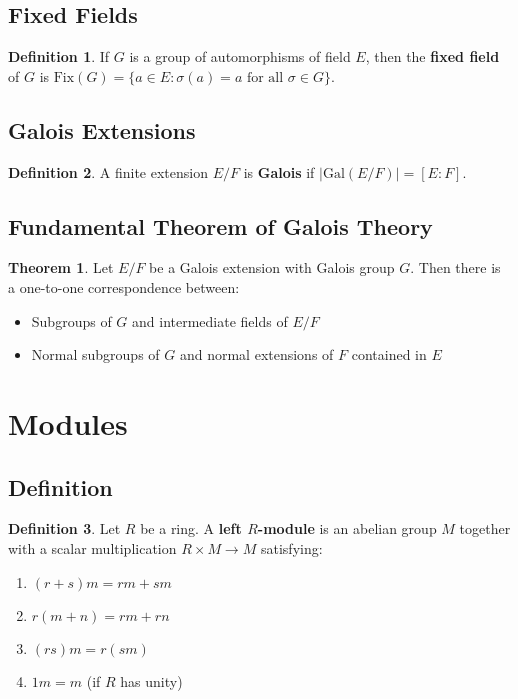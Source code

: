 \documentclass[11pt]{article}
\theoremstyle{definition}
\newtheorem{definition}{Definition}[section]
\newtheorem{theorem}{Theorem}[section]
\begin{document}
\subsection{Fixed Fields}
\begin{definition}
If $G$ is a group of automorphisms of field $E$, then the \textbf{fixed field} of $G$ is $\text{Fix}(G) = \{a \in E : \sigma(a) = a \text{ for all } \sigma \in G\}$.
\end{definition}

\subsection{Galois Extensions}
\begin{definition}
A finite extension $E/F$ is \textbf{Galois} if $|\text{Gal}(E/F)| = [E:F]$.
\end{definition}

\subsection{Fundamental Theorem of Galois Theory}
\begin{theorem}
Let $E/F$ be a Galois extension with Galois group $G$. Then there is a one-to-one correspondence between:
\begin{itemize}
    \item Subgroups of $G$ and intermediate fields of $E/F$
    \item Normal subgroups of $G$ and normal extensions of $F$ contained in $E$
\end{itemize}
\end{theorem}

\section{Modules}

\subsection{Definition}
\begin{definition}
Let $R$ be a ring. A \textbf{left $R$-module} is an abelian group $M$ together with a scalar multiplication $R \times M \to M$ satisfying:
\begin{enumerate}
    \item $(r + s)m = rm + sm$
    \item $r(m + n) = rm + rn$
    \item $(rs)m = r(sm)$
    \item $1m = m$ (if $R$ has unity)
\end{enumerate}
\end{definition}
\end{document}
